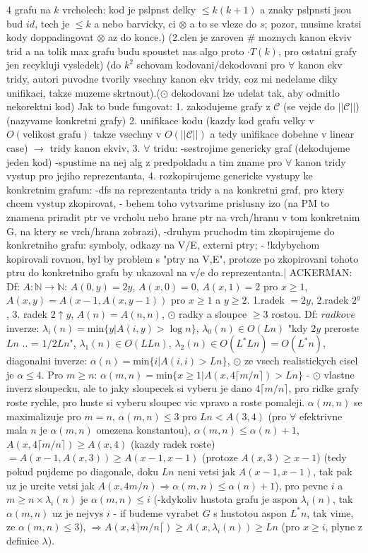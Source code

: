 \documentclass[8pt]{extarticle}
\begin{document}
\begin{multicols*}{4}
grafu na $k$ vrcholech: kod je pslpnst delky $\leq k(k+1)$ a znaky pslpnsti jsou bud $id$, tech je $\leq k$ a nebo barvicky, ci $\otimes$ a to se vleze do $s$; pozor, musime kratsi kody doppadingovat $\otimes$ az do konce.) (2.clen je zaroven \# moznych kanon ekviv trid a na tolik max grafu budu spoustet nas algo proto $\cdot T(k)$, pro ostatni grafy jen recykluji vysledek) (do $k^2$ schovam kodovani/dekodovani pro $\forall$ kanon ekv tridy, autori puvodne tvorily vsechny kanon ekv tridy, coz mi nedelame diky unifikaci, takze muzeme skrtnout).($\odot$ dekodovani lze udelat tak, aby odmitlo nekorektni kod) Jak to bude fungovat: 1. zakodujeme grafy z $\mathcal{C}$ (se vejde do $||\mathcal{C}||$) (nazyvame konkretni grafy) 2. unifikace kodu (kazdy kod grafu velky v $O(\text{velikost grafu})$ takze vsechny v  $O(||\mathcal{C}||)$ a tedy unifikace dobehne v linear case) $\rightarrow$ tridy kanon ekviv, 3. $\forall$ tridu: -sestrojime genericky graf (dekodujeme jeden kod) -spustime na nej alg z predpokladu a tim zname pro $\forall$ kanon tridy vystup pro jejiho reprezentanta, 4. rozkopirujeme genericke vystupy ke konkretnim grafum: -dfs na reprezentanta tridy a na konkretni graf, pro ktery chcem vystup zkopirovat, - behem toho vytvarime prislusny izo (na PM to znamena priradit ptr ve vrcholu nebo hrane ptr na vrch/hranu v tom konkretnim G, na ktery se vrch/hrana zobrazi), -druhym pruchodm tim zkopirujeme do konkretniho grafu: symboly, odkazy na V/E, externi ptry; - !kdybychom kopirovali rovnou, byl by problem s "ptry na V,E", protoze po zkopirovani tohoto ptru do konkretniho grafu by ukazoval na v/e do reprezentanta.| ACKERMAN: Df: $A: \mathbb{N}\rightarrow\mathbb{N}$: $A(0,y) = 2y$, $A(x,0) = 0$, $A(x,1)=2$ pro $x\geq1$, $A(x,y) = A(x-1, A(x,y-1))$ pro $x\geq1$ a $y\geq2$. 1.radek $=2y$, 2.radek $2^y$, 3. radek $2\uparrow y$, $A(n)=A(n,n)$, $\odot$ radky a sloupce $\geq 3$ rostou. Df: $radkove$ inverze: $\lambda_i(n)= \text{min}\{y | A(i,y) > \log n\}$, $\lambda_0(n)\in O(Ln)$ "kdy $2y$ preroste $Ln$ .. = $1/2 Ln$", $\lambda_1(n)\in O(LLn)$, $\lambda_2(n)\in O(L^*Ln) = O(L^*n)$, diagonalni inverze: $\alpha(n) = \text{min}\{ i | A(i,i) > Ln\}$, $\odot$ ze vsech realistickych cisel je $\alpha \leq 4$. Pro $m\geq n$: $\alpha(m,n) = \text{min}\{x\geq1 | A(x, 4\lceil m/n\rceil)>Ln\}$ - $\odot$ vlastne inverz sloupecku, ale to jaky sloupecek si vyberu je dano $4\lceil m/n\rceil$, pro ridke grafy roste rychle, pro huste si vyberu sloupec vic vpravo a roste pomaleji. $\alpha(m,n)$ se maximalizuje pro $m=n$, $\alpha(m,n) \leq 3$ pro $Ln<A(3,4)$ (pro $\forall$ efektrivne mala $n$ je $\alpha(m,n)$ omezena konstantou), $\alpha(m,n)\leq\alpha(n) +1$, $A(x,4\lceil m/n\rceil) \geq A(x,4)$ (kazdy radek roste) $=A(x-1, A(x,3)) \geq A(x-1, x-1)$ (protoze $A(x,3)\geq x-1$) (tedy pokud pujdeme po diagonale, doku $Ln$ neni vetsi jak $A(x-1,x-1)$, tak pak uz je urcite vetsi jak $A(x, 4m/n) \Rightarrow \alpha(m,n) \leq \alpha(n)+1$), pro pevne $i$ a $m\geq n\times\lambda_i(n)$ je $\alpha(m,n) \leq i$ (-kdykoliv hustota grafu je aspon $\lambda_i(n)$, tak $\alpha(m,n)$ uz je nejvys $i$ - if budeme vyrabet $G$ s hustotou aspon $L^*n$, tak vime, ze $\alpha(m,n)\leq 3$), $\Rightarrow A(x, 4\rceil m/n \lceil) \geq A(x, \lambda_i(n)) \geq Ln$ (pro $x\geq i$, plyne z definice $\lambda$).

\end{multicols*}
\end{document}
